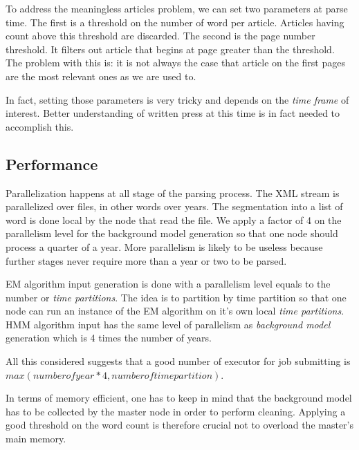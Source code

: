 To address the meaningless articles problem, we can set two parameters at parse time. The first is a threshold on the number of word per article. Articles having count above this threshold are discarded. The second is the page number threshold. It filters out article that begins at page greater than the threshold. The problem with this is: it is not always the case that article on the first pages are the most relevant ones as we are used to.

In fact, setting those parameters is very tricky and depends on the \emph{time frame} of interest. Better understanding of written press at this time is in fact needed to accomplish this.

\subsection{Performance}

Parallelization happens at all stage of the parsing process. The XML stream is parallelized over files, in other words over years. The segmentation into a list of word is done local by the node that read the file. We apply a factor of 4 on the parallelism level for the background model generation so that one node should process a quarter of a year. More parallelism is likely to be useless because further stages never require more than a year or two to be parsed.

EM algorithm input generation is done with a parallelism level equals to the number or \emph{time partitions}. The idea is to partition by time partition so that one node can run an instance of the EM algorithm on it's own local  \emph{time partitions}. HMM algorithm input has the same level of parallelism as \emph{background model} generation which is 4 times the number of years. 

All this considered suggests that a good number of executor for job submitting is $max(number of year*4, number of time partition)$.

In terms of memory efficient, one has to keep in mind that the background model has to be collected by the master node in order to perform cleaning. Applying a good threshold on the word count is therefore crucial not to overload the master's main memory.



